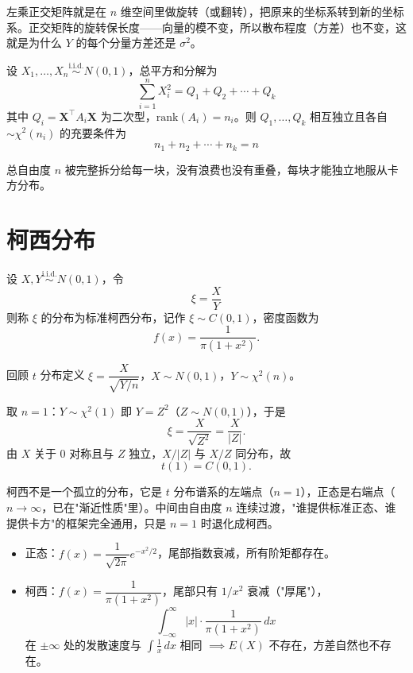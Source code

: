 \begin{note}[正交变换的几何意义]
左乘正交矩阵就是在 $n$ 维空间里做旋转（或翻转），把原来的坐标系转到新的坐标系。正交矩阵的旋转保长度——向量的模不变，所以散布程度（方差）也不变，这就是为什么 $Y$ 的每个分量方差还是 $\sigma^2$。
\end{note}
\begin{theorem}[柯赫伦定理]
设 $X_1, \ldots, X_n \overset{\text{i.i.d.}}{\sim} N(0,1)$，总平方和分解为
$$\sum_{i=1}^n X_i^2 = Q_1 + Q_2 + \cdots + Q_k$$
其中 $Q_i = \boldsymbol{X}^\top A_i \boldsymbol{X}$ 为二次型，$\mathrm{rank}(A_i) = n_i$。则 $Q_1, \ldots, Q_k$ 相互独立且各自 $\sim \chi^2(n_i)$ 的充要条件为
$$n_1 + n_2 + \cdots + n_k = n$$
\end{theorem}

\begin{note}[直觉]
总自由度 $n$ 被完整拆分给每一块，没有浪费也没有重叠，每块才能独立地服从卡方分布。
\end{note}
\section{柯西分布}\begin{definition}[标准柯西分布]
设 $X,Y\overset{\text{i.i.d.}}{\sim} N(0,1)$，令
$$\xi=\frac{X}{Y}$$
则称 $\xi$ 的分布为标准柯西分布，记作 $\xi\sim C(0,1)$，密度函数为
$$f(x)=\frac{1}{\pi(1+x^2)}.$$
\end{definition}

\begin{note}[柯西与 $t$ 分布的关系：$t(1)=C(0,1)$]
回顾 $t$ 分布定义 $\xi=\dfrac{X}{\sqrt{Y/n}}$，$X\sim N(0,1)$，$Y\sim\chi^2(n)$。

取 $n=1$：$Y\sim\chi^2(1)$ 即 $Y=Z^2$（$Z\sim N(0,1)$），于是
$$\xi=\frac{X}{\sqrt{Z^2}}=\frac{X}{|Z|}.$$
由 $X$ 关于 $0$ 对称且与 $Z$ 独立，$X/|Z|$ 与 $X/Z$ 同分布，故
$$t(1)=C(0,1).$$
\end{note}

\begin{dxtips}
柯西不是一个孤立的分布，它是 $t$ 分布谱系的左端点（$n=1$），正态是右端点（$n\to\infty$，已在"渐近性质"里）。中间由自由度 $n$ 连续过渡，"谁提供标准正态、谁提供卡方"的框架完全通用，只是 $n=1$ 时退化成柯西。
\end{dxtips}

\begin{note}
\begin{itemize}
  \item 正态：$f(x)=\dfrac{1}{\sqrt{2\pi}}e^{-x^2/2}$，尾部指数衰减，所有阶矩都存在。
  \item 柯西：$f(x)=\dfrac{1}{\pi(1+x^2)}$，尾部只有 $1/x^2$ 衰减（"厚尾"），
  $$\int_{-\infty}^{\infty}|x|\cdot\frac{1}{\pi(1+x^2)}\,dx$$
  在 $\pm\infty$ 处的发散速度与 $\displaystyle\int\frac{1}{x}\,dx$ 相同 $\implies E(X)$ 不存在，方差自然也不存在。
\end{itemize}
\end{note}

